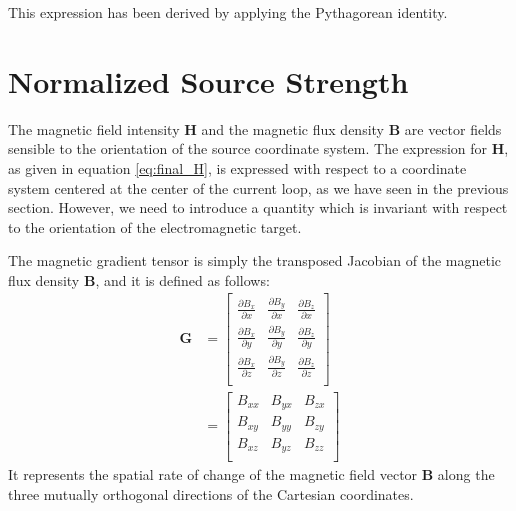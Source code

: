 This expression has been derived by applying the Pythagorean identity.

\section{Normalized Source Strength}
The magnetic field intensity $\mathbf{H}$ and the magnetic flux density $\mathbf{B}$ are vector fields 
sensible to the orientation of the source coordinate system. 
The expression for $\mathbf{H}$, as given in equation \ref{eq:final_H}, is expressed with respect to a 
coordinate system centered at the center of the current loop, as we have seen in the previous section.
However, we need to introduce a quantity which is invariant with
respect to the orientation of the electromagnetic target.

The magnetic gradient tensor is simply the transposed Jacobian of the magnetic flux density $\mathbf{B}$, and it is defined
as follows:
\begin{equation}
\begin{aligned}
\mathbf{G} &= 
\begin{bmatrix}
    \frac{\partial B_x}{\partial x} & \frac{\partial B_y}{\partial x} & \frac{\partial B_z}{\partial x}\\
    \frac{\partial B_x}{\partial y} & \frac{\partial B_y}{\partial y} & \frac{\partial B_z}{\partial y}\\
    \frac{\partial B_x}{\partial z} & \frac{\partial B_y}{\partial z} & \frac{\partial B_z}{\partial z}\\
\end{bmatrix}
\\
&=
\begin{bmatrix}
    B_{xx} & B_{yx} & B_{zx}\\
    B_{xy} & B_{yy} & B_{zy}\\
    B_{xz} & B_{yz} & B_{zz}\\
\end{bmatrix}
\end{aligned}
\label{eq:Jacobian}
\end{equation}
It represents the spatial rate of change of the magnetic field vector $\mathbf{B}$
along the three mutually orthogonal directions of the Cartesian coordinates.


